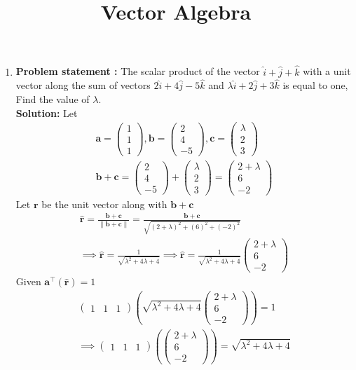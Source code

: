 \documentclass[10pt]{article}
\providecommand{\brak}[1]{\ensuremath{\left(#1\right)}}
\newcommand{\solution}{\noindent \textbf{Solution: }}
\newcommand{\myvec}[1]{\ensuremath{\begin{pmatrix}#1\end{pmatrix}}}
\providecommand{\norm}[1]{\left\lVert#1\right\rVert}
\let\vec\mathbf{}
\begin{document}
\begin{center}
\title{\textbf{Vector Algebra}}
\date{\vspace{-5ex}} %
\maketitle
\end{center}

\begin{enumerate}
\item\textbf{Problem statement :} The scalar product of the vector $\hat{i}+\hat{j}+\hat{k}$ with a unit vector along the sum of vectors $2\hat{i}+4\hat{j}-5\hat{k}$ and $\lambda\hat{i}+2\hat{j}+3\hat{k}$ is equal to one, Find the value of $\lambda$.
\\
\solution
Let
\begin{align}
\vec{a} =\myvec{1\\1\\1} , \vec{b}=\myvec{2\\4\\-5} , \vec{c}=\myvec{\lambda\\2\\3}\\
\vec{b}+\vec{c}=\myvec{2\\4\\-5}+\myvec{\lambda\\2\\3}=\myvec{2+\lambda\\6\\-2}
\end{align}
Let $\vec{r}$ be the unit vector along with $\vec{b}+\vec{c}$
\begin{align}
\hat{\vec{r}}=\frac{\vec{b}+\vec{c}}{\norm{\vec{b}+\vec{c}}}=\frac{\vec{b}+\vec{c}}{\sqrt{\brak{2+\lambda}^2+\brak{6}^2+\brak{-2}^2}}\\
\implies\hat{\vec{r}}=\frac{1}{\sqrt{\lambda^2+4\lambda+4}}
\implies\hat{\vec{r}}=\frac{1}{\sqrt{\lambda^2+4\lambda+4}}\myvec{2+\lambda\\6\\-2}
\end{align}
Given $\vec{a}^\top\brak{\vec{\hat{r}}} = 1$
\begin{align}
\myvec{1&1&1}\brak{{\sqrt{\lambda^2+4\lambda+4}}\myvec{2+\lambda\\6\\-2}}=1\\
\implies \myvec{1&1&1}\brak{\myvec{2+\lambda\\6\\-2}}={\sqrt{\lambda^2+4\lambda+4}}\\

\end{align}
\end{enumerate}
\end{document}
